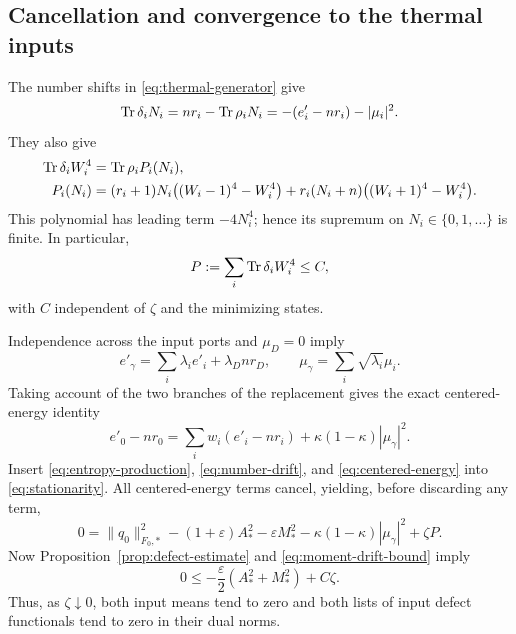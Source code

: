 \subsection{Cancellation and convergence to the thermal inputs}
The number shifts in \eqref{eq:thermal-generator} give
\begin{equation}\label{eq:number-drift}
 \operatorname{Tr}\delta_iN_i=nr_i-\operatorname{Tr}\rho_iN_i
              =-(e'_i-nr_i)-|\mu_i|^2.
\end{equation}
They also give
\begin{align}
 \operatorname{Tr}\delta_iW_i^4&=\operatorname{Tr}\rho_iP_i(N_i),\label{eq:moment-drift}\\
 P_i(N_i)&=(r_i+1)N_i\bigl((W_i-1)^4-W_i^4\bigr)
       +r_i(N_i+n)\bigl((W_i+1)^4-W_i^4\bigr).\notag
\end{align}
This polynomial has leading term $-4N_i^4$; hence its supremum on
$N_i\in\{0,1,\ldots\}$ is finite.  In particular,
\begin{equation}\label{eq:moment-drift-bound}
 P:=\sum_i\operatorname{Tr}\delta_iW_i^4\le C,
\end{equation}
with $C$ independent of $\zeta$ and the minimizing states.

Independence across the input ports and $\mu_D=0$ imply
\[
 e'_\gamma=\sum_i\lambda_ie'_i+\lambda_Dnr_D,
 \qquad \mu_\gamma=\sum_i\sqrt{\lambda_i}\mu_i.
\]
Taking account of the two branches of the replacement gives the exact
centered-energy identity
\begin{equation}\label{eq:centered-energy}
 e'_0-nr_0=\sum_iw_i(e'_i-nr_i)
                 +\kappa(1-\kappa)|\mu_\gamma|^2.
\end{equation}
Insert \eqref{eq:entropy-production}, \eqref{eq:number-drift}, and
\eqref{eq:centered-energy} into \eqref{eq:stationarity}.
All centered-energy terms cancel, yielding, before discarding any term,
\begin{equation}\label{eq:exact-cancellation}
 0=\|q_0\|_{F_0,*}^2-(1+\varepsilon)A_*^2
       -\varepsilon M_*^2
       -\kappa(1-\kappa)|\mu_\gamma|^2+\zeta P.
\end{equation}
Now Proposition~\ref{prop:defect-estimate} and
\eqref{eq:moment-drift-bound} imply
\begin{equation}\label{eq:vanishing-defects}
 0\le-\frac\varepsilon2(A_*^2+M_*^2)+C\zeta.
\end{equation}
Thus, as $\zeta\downarrow0$, both input means tend to zero and both
lists of input defect functionals tend to zero in their dual norms.

